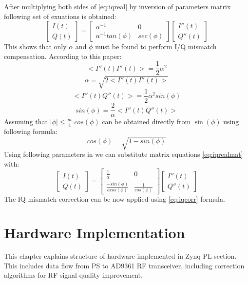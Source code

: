 \documentclass[en,printmode]{mgr}
\begin{document}
		After multiplying both sides of \ref{eq:iqreal} by inversion of parameters matrix following set of exuations
		is obtained:
		\begin{equation}
			\begin{bmatrix}
				I(t) \\
				Q(t)
			\end{bmatrix}
			=
			\begin{bmatrix}
				\alpha^{-1} & 0 \\
				\alpha^{-1}tan(\phi) & sec(\phi)
			\end{bmatrix}
			\begin{bmatrix}
				I''(t) \\
				Q''(t)
			\end{bmatrix}
		\end{equation}
		This shows that only $\alpha$ and $\phi$ must be found to perform I/Q mismatch
		compensation. According to this paper:
		\[
			<I''(t)I''(t)> = \frac{1}{2}\alpha^2
		\]
		\[
			\alpha = \sqrt{2<I''(t)I''(t)>}
		\]
		\[
			<I''(t)Q''(t)> = \frac{1}{2}\alpha^2sin(\phi)
		\]
		\[
			sin(\phi)= \frac{2}{\alpha}<I''(t)Q''(t)>
		\]
		Assuming that $|\phi| \leq \frac{pi}{4}$ $cos(\phi)$ can be obtained directly from
		$\sin(\phi)$ using following formula:
		\[
		 	cos(\phi) = \sqrt{1-sin(\phi)}
		\]
		Using following parameters in we can substitute matrix equations \ref{eq:iqrealmat} with:
		\begin{equation}
			\begin{bmatrix} 
				I(t) \\
				Q(t)
			\end{bmatrix}
			=
			\begin{bmatrix}
				\frac{1}{\alpha} & 0 \\
				\frac{-sin(\phi)}{acos(\phi)} & \frac{1}{cos(\phi)}
			\end{bmatrix}
			\begin{bmatrix}
				I''(t) \\
				Q''(t)
			\end{bmatrix}\label{eq:iqcorr}
		\end{equation}
		The IQ mismatch correction  can be now applied using \ref{eq:iqcorr} formula.
	
\chapter{Hardware Implementation}
	This chapter explains structure of hardware implemented in Zynq PL section. This includes data flow
	from PS to AD9361 RF transceiver, including correction algorithms for RF signal quality improvement.
	
\end{document}
